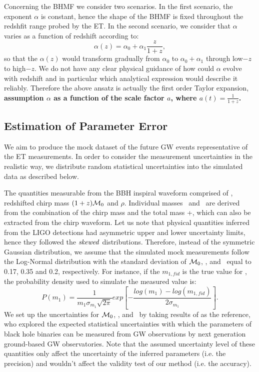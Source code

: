 \documentclass[twocolumn]{aastex62}
\newcommand{\kai}[1]{\textcolor{red}{[{\bf Kai}: #1]}}
\begin{document}
Concerning the BHMF we consider two scenarios. In the first scenario, the exponent $\alpha$ is constant, hence the shape of the BHMF is fixed throughout the redshfit range probed by the ET. In the second scenario, we consider that $\alpha$ varies as a function of redshift according to:
 \begin{equation} \label{equ_alphaz}
\alpha(z) = \alpha_0 + \alpha_1\frac{z}{1+z} , 
 \end{equation}
so that the $\alpha(z)$ would transform gradually from $\alpha_0$ to $\alpha_0+\alpha_1$ through low$-z$ to high$-z$. We do not have any clear physical guidance of how could $\alpha$ evolve  with redshift and in particular which analytical expression would describe it reliably. Therefore the above ansatz is actually the first order Taylor expansion{, \bf assumption $\alpha$ as a function of the scale factor $a$, where $a(t) = \frac{1}{1+z}$.} 

\subsection{Estimation of Parameter Error} \label{sec_noiselevel}
We aim to produce the mock dataset of the future GW events representative of the ET  measurements. In order to consider the measurement uncertainties in the realistic way, we distribute random statistical uncertainties into the simulated data as described below.

The quantities measurable from the BBH inspiral waveform comprised of \dl, redshifted chirp mass $(1+z){\cal M}_0 $ and $\rho$. Individual masses \mone\ and \mtwo\ are derived from the combination of the chirp mass and the total mass \mone+\mtwo, which can also be extracted from the chirp waveform. 
Let us note that physical quantities inferred from the LIGO detections had asymmetric upper and lower uncertainty limits, hence they followed the  ${\it skewed}$  distributions. Therefore, instead of the symmetric Gaussian distribution, we assume that the simulated mock measurements follow the Log-Normal distribution with the standard deviation of  ${\cal M}_0$, \dl, and \mone\ equal to 0.17, 0.35 and 0.2, respectively.
For instance, if the $m_{1,fid}$ is the true value for \mone, the probability density used to simulate the measured value is:
 \begin{equation} \label{equ_lognorm}
P(m_1) = \frac{1}{m_1 \sigma_{m_1} \sqrt{2\pi}} exp \left[- \frac{log(m_1)-log(m_{1,fid})}{2\sigma_{m_1}} \right].
 \end{equation}
We set up the uncertainties for ${\cal M}_0$, \dl, and \mone\ by taking results of \citet{Ghosh2016} as the reference, who explored the expected statistical uncertainties with which the parameters of black hole binaries can be measured from GW observations by next generation ground-based GW observatories. Note that the assumed uncertainty level of these quantities only affect the uncertainty of the inferred parameters (i.e. the precision) and wouldn't affect the validity test of our method (i.e. the  accuracy).
 
\end{document}
